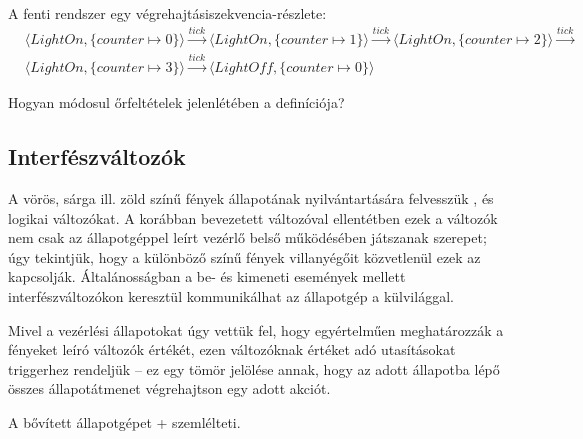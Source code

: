 
\begin{pelda}
A fenti rendszer egy végrehajtásiszekvencia-részlete:
\begin{align*}
& \langle \mathit{LightOn}, \{ \mathit{counter} \mapsto 0 \} \rangle \xrightarrow{\mathit{tick}}
  \langle \mathit{LightOn}, \{ \mathit{counter} \mapsto 1 \} \rangle \xrightarrow{\mathit{tick}}
  \langle \mathit{LightOn}, \{ \mathit{counter} \mapsto 2 \} \rangle \xrightarrow{\mathit{tick}} \\
& \langle \mathit{LightOn}, \{ \mathit{counter} \mapsto 3 \} \rangle \xrightarrow{\mathit{tick}}
  \langle \mathit{LightOff}, \{ \mathit{counter} \mapsto 0 \} \rangle
\end{align*}

\end{pelda}

\begin{feladat}
Hogyan módosul őrfeltételek jelenlétében a  definíciója?
\end{feladat}

\subsection{Interfészváltozók}

A vörös, sárga ill. zöld színű fények állapotának nyilvántartására felvesszük ,  és  logikai változókat. A korábban bevezetett  változóval ellentétben ezek a változók nem csak az állapotgéppel leírt vezérlő belső működésében játszanak szerepet; úgy tekintjük, hogy a különböző színű fények villanyégőit közvetlenül ezek az  kapcsolják. Általánosságban a be- és kimeneti események mellett interfészváltozókon keresztül kommunikálhat az állapotgép a külvilággal.

Mivel a vezérlési állapotokat úgy vettük fel, hogy egyértelműen meghatározzák a fényeket leíró változók értékét, ezen változóknak értéket adó utasításokat  triggerhez rendeljük -- ez egy tömör jelölése annak, hogy az adott állapotba lépő összes állapotátmenet végrehajtson egy adott akciót.


A bővített állapotgépet \az+ szemlélteti.

